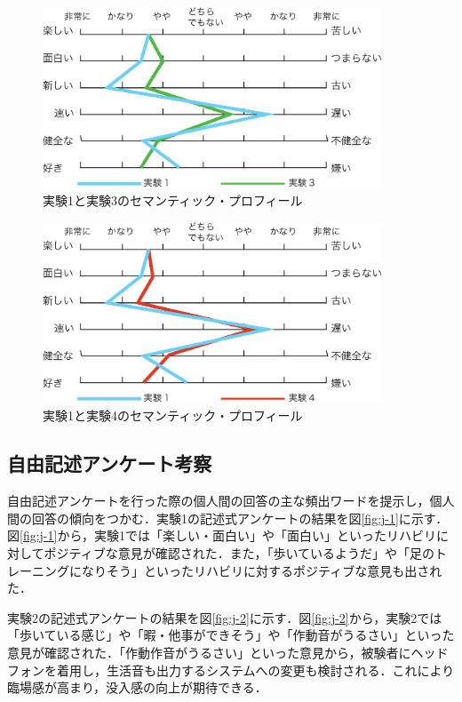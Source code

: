 \begin{figure}[tbp]
	\centering
			\includegraphics[width=0.9\textwidth]{chap3-figure/j1-3.eps}
	\caption{実験1と実験3のセマンティック・プロフィール}
	\label{fig:j-1-3}
\end{figure}
\begin{figure}[tbp]
	\centering
			\includegraphics[width=0.9\textwidth]{chap3-figure/j1-4.eps}
	\caption{実験1と実験4のセマンティック・プロフィール}
	\label{fig:j-1-4}
\end{figure}

\subsection{自由記述アンケート考察}
自由記述アンケートを行った際の個人間の回答の主な頻出ワードを提示し，個人間の回答の傾向をつかむ．実験1の記述式アンケートの結果を図\ref{fig:j-1}に示す．図\ref{fig:j-1}から，実験1では「楽しい・面白い」や「面白い」といったリハビリに対してポジティブな意見が確認された．また，「歩いているようだ」や「足のトレーニングになりそう」といったリハビリに対するポジティブな意見も出された．

実験2の記述式アンケートの結果を図\ref{fig:j-2}に示す．図\ref{fig:j-2}から，実験2では「歩いている感じ」や「暇・他事ができそう」や「作動音がうるさい」といった意見が確認された．「作動作音がうるさい」といった意見から，被験者にヘッドフォンを着用し，生活音も出力するシステムへの変更も検討される．これにより臨場感が高まり，没入感の向上が期待できる．

